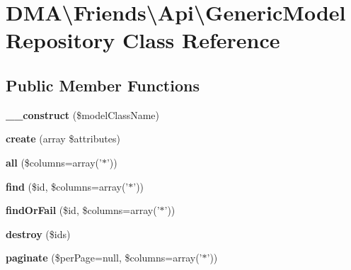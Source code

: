 \hypertarget{classDMA_1_1Friends_1_1Api_1_1GenericModelRepository}{\section{D\+M\+A\textbackslash{}Friends\textbackslash{}Api\textbackslash{}Generic\+Model\+Repository Class Reference}
\label{classDMA_1_1Friends_1_1Api_1_1GenericModelRepository}
}
\subsection*{Public Member Functions}
\begin{DoxyCompactItemize}
\item 
\hypertarget{classDMA_1_1Friends_1_1Api_1_1GenericModelRepository_a320f3591265cbdf46a9c9fa26927df10}{{\bfseries \+\_\+\+\_\+construct} (\$model\+Class\+Name)}\label{classDMA_1_1Friends_1_1Api_1_1GenericModelRepository_a320f3591265cbdf46a9c9fa26927df10}

\item 
\hypertarget{classDMA_1_1Friends_1_1Api_1_1GenericModelRepository_ac0e8251f4383610298dddda3eb7958d7}{{\bfseries create} (array \$attributes)}\label{classDMA_1_1Friends_1_1Api_1_1GenericModelRepository_ac0e8251f4383610298dddda3eb7958d7}

\item 
\hypertarget{classDMA_1_1Friends_1_1Api_1_1GenericModelRepository_a4c88d28c6fc169ae1eead0b0aa3866f9}{{\bfseries all} (\$columns=array('$\ast$'))}\label{classDMA_1_1Friends_1_1Api_1_1GenericModelRepository_a4c88d28c6fc169ae1eead0b0aa3866f9}

\item 
\hypertarget{classDMA_1_1Friends_1_1Api_1_1GenericModelRepository_ab42b1bda9479d9990e04c9d45f2a0e0d}{{\bfseries find} (\$id, \$columns=array('$\ast$'))}\label{classDMA_1_1Friends_1_1Api_1_1GenericModelRepository_ab42b1bda9479d9990e04c9d45f2a0e0d}

\item 
\hypertarget{classDMA_1_1Friends_1_1Api_1_1GenericModelRepository_a0fe974a6605164516635931f06eb4c30}{{\bfseries find\+Or\+Fail} (\$id, \$columns=array('$\ast$'))}\label{classDMA_1_1Friends_1_1Api_1_1GenericModelRepository_a0fe974a6605164516635931f06eb4c30}

\item 
\hypertarget{classDMA_1_1Friends_1_1Api_1_1GenericModelRepository_a82078490bec0c283af63fb52200224a0}{{\bfseries destroy} (\$ids)}\label{classDMA_1_1Friends_1_1Api_1_1GenericModelRepository_a82078490bec0c283af63fb52200224a0}

\item 
\hypertarget{classDMA_1_1Friends_1_1Api_1_1GenericModelRepository_a2d7794ceb5795fef531ad856b36d0daa}{{\bfseries paginate} (\$per\+Page=null, \$columns=array('$\ast$'))}\label{classDMA_1_1Friends_1_1Api_1_1GenericModelRepository_a2d7794ceb5795fef531ad856b36d0daa}

\end{DoxyCompactItemize}
